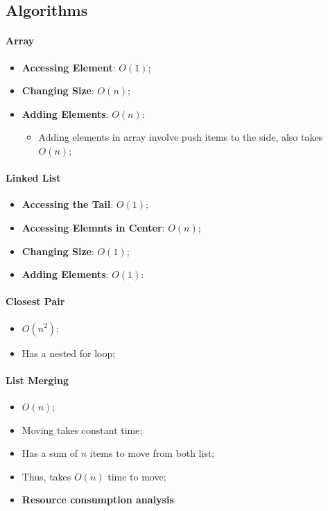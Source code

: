 \documentclass[letterpaper, 11pt]{article}
\begin{document}
    \subsection{Algorithms}
    
      \paragraph{Array}
      \begin{itemize}
        \item \textbf{Accessing Element}: $ O \left( 1 \right) $;
        \item \textbf{Changing Size}: $ O \left( n \right) $;
        \item \textbf{Adding Elements}: $ O \left( n \right) $:
        \begin{itemize}
          \item Adding elements in array involve push items to the side, also takes $ O \left( n \right) $;
        \end{itemize}
      \end{itemize}
      
      \paragraph{Linked List}
      \begin{itemize}
        \item \textbf{Accessing the Tail}: $ O \left( 1 \right) $;
        \item \textbf{Accessing Elemnts in Center}: $ O \left( n \right) $;
        \item \textbf{Changing Size}: $ O \left( 1 \right) $;
        \item \textbf{Adding Elements}: $ O \left( 1 \right) $:
      \end{itemize}
      
      \paragraph{Closest Pair}
      \begin{itemize}
        \item $ O \left( n^{2} \right) $;
        \item Has a nested for loop;
      \end{itemize}
      
      \paragraph{List Merging}
      \begin{itemize}
        \item $ O \left( n \right) $;
        \item Moving takes constant time;
        \item Has a sum of $ n $ items to move from both list;
        \item Thus, takes $ O \left( n \right) $ time to move;
        \item \textbf{Resource consumption analysis}
      \end{itemize}
      
\end{document}
